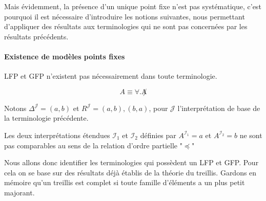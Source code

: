 \par Mais évidemment, la présence d'un unique point fixe n'est pas systématique, c'est pourquoi il est nécessaire d'introduire les notions suivantes, nous permettant d'appliquer des résultats aux terminologies qui ne sont pas concernées par les résultats précédents.



\paragraph{Existence de modèles points fixes}
\label{sec:existence-de-modeles}

\par LFP et GFP n'existent pas nécessairement dans toute terminologie.

\begin{exemple}
  \begin{displaymath}
    A \equiv \forall. \not A
  \end{displaymath}
  \par Notons $\Delta^\mathcal{J} = {(a,b)}$ et $R^\mathcal{J} = {(a,b),(b,a)}$, pour $\mathcal{J}$ l'interprétation de base de la terminologie précédente.
  \par Les deux interprétations étendues $\mathcal{I}_1$ et $\mathcal{I}_2$ définies par $A^{\mathcal{I}_1} = {a}$ et $A^{\mathcal{I}_2} = {b}$ ne sont pas comparables au sens de la relation d'ordre partielle "$\preceq$"
\end{exemple}

\par Nous allons donc identifier les terminologies qui possèdent un LFP et GFP. Pour cela on se base sur des résultats déjà établis de la théorie du treillis. Gardons en mémoire qu'un treillis est complet si toute famille d'éléments a un plus petit majorant.

